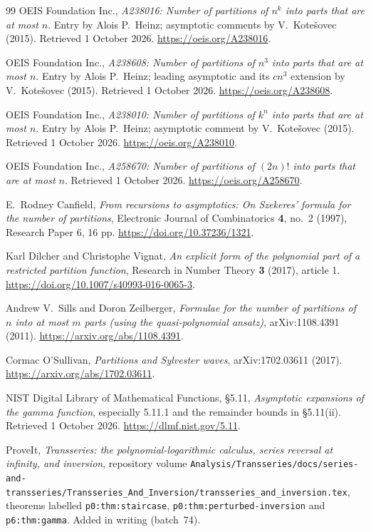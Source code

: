 \documentclass[11pt]{article}
\theoremstyle{definition}
\theoremstyle{remark}
\numberwithin{equation}{section}
\begin{document}
\begingroup
\small
\begin{thebibliography}{99}
\setlength{\itemsep}{3pt}
OEIS Foundation Inc., \emph{A238016: Number of partitions of $n^k$ into parts
that are at most $n$}. Entry by Alois P.~Heinz; asymptotic comments by
V.~Kote\v{s}ovec (2015). Retrieved 1 October 2026.
\url{https://oeis.org/A238016}.

OEIS Foundation Inc., \emph{A238608: Number of partitions of $n^3$ into parts
that are at most $n$}. Entry by Alois P.~Heinz; leading asymptotic and its
$c n^3$ extension by V.~Kote\v{s}ovec (2015). Retrieved 1 October 2026.
\url{https://oeis.org/A238608}.

OEIS Foundation Inc., \emph{A238010: Number of partitions of $k^n$ into parts
that are at most $n$}. Entry by Alois P.~Heinz; asymptotic comment by
V.~Kote\v{s}ovec (2015). Retrieved 1 October 2026.
\url{https://oeis.org/A238010}.

OEIS Foundation Inc., \emph{A258670: Number of partitions of $(2n)!$ into
parts that are at most $n$}. Retrieved 1 October 2026.
\url{https://oeis.org/A258670}.

E.~Rodney Canfield, \emph{From recursions to asymptotics: On Szekeres' formula
for the number of partitions}, Electronic Journal of Combinatorics
\textbf{4}, no.~2 (1997), Research Paper 6, 16 pp.
\url{https://doi.org/10.37236/1321}.

Karl Dilcher and Christophe Vignat, \emph{An explicit form of the polynomial
part of a restricted partition function}, Research in Number Theory
\textbf{3} (2017), article 1.
\url{https://doi.org/10.1007/s40993-016-0065-3}.

Andrew V.~Sills and Doron Zeilberger, \emph{Formulae for the number of
partitions of $n$ into at most $m$ parts (using the quasi-polynomial ansatz)},
arXiv:1108.4391 (2011).
\url{https://arxiv.org/abs/1108.4391}.

Cormac O'Sullivan, \emph{Partitions and Sylvester waves},
arXiv:1702.03611 (2017).
\url{https://arxiv.org/abs/1702.03611}.

NIST Digital Library of Mathematical Functions, \S5.11,
\emph{Asymptotic expansions of the gamma function}, especially 5.11.1
and the remainder bounds in \S5.11(ii). Retrieved 1 October 2026.
\url{https://dlmf.nist.gov/5.11}.

ProveIt, \emph{Transseries: the polynomial-logarithmic calculus, series
reversal at infinity, and inversion}, repository volume
\nolinkurl{Analysis/Transseries/docs/series-and-transseries/Transseries_And_Inversion/transseries_and_inversion.tex},
theorems labelled \texttt{p0:thm:staircase},
\texttt{p0:thm:perturbed-inversion} and \texttt{p6:thm:gamma}. Added in
writing (batch~74).


\end{thebibliography}
\end{document}
